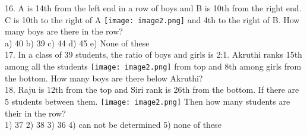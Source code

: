 \documentclass[
]{article}
\begin{document}
16. A is 14th from the left end in a row of boys and B is 10th from the right end. C is 10th to the right of A \texttt{[image: image2.png]}
and 4th to the right of B. How many boys are there in the row?\\
a) 40 \hspace{2mm}b) 39 \hspace{2mm}c) 44 \hspace{2mm}d) 45 \hspace{2mm}e) None of these\\

17. In a class of 39 students, the ratio of boys and girls is 2:1. Akruthi ranks 15th among all the students \texttt{[image: image2.png]}
from top and 8th among girls from the bottom. How many boys are there below Akruthi?\\

18. Raju is 12th from the top and Siri rank is 26th from the bottom. If there are 5 students between them. \texttt{[image: image2.png]}
Then how many students are their in the row?\\
1) 37 \hspace{2mm}2) 38 \hspace{2mm}3) 36 \hspace{2mm}4) can not be determined \hspace{2mm}5) none of these
\end{document}
